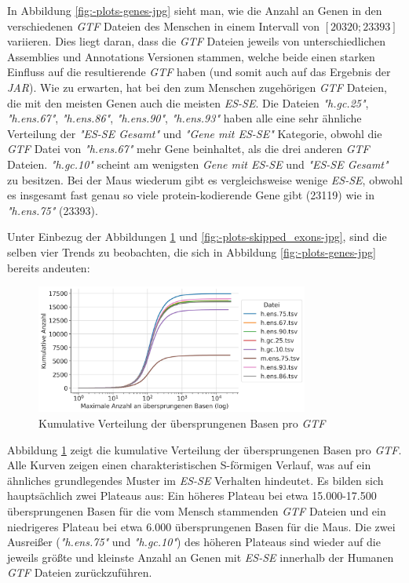 \documentclass[12pt]{article}
\begin{document}
In Abbildung \ref{fig:-plots-genes-jpg} sieht man, wie die Anzahl an Genen in den verschiedenen \textit{GTF} Dateien des
Menschen in einem Intervall von $[20320; 23393]$ variieren. Dies liegt daran, dass die
\textit{GTF} Dateien jeweils von unterschiedlichen Assemblies und Annotations Versionen stammen,
welche beide einen starken Einfluss auf die resultierende \textit{GTF} haben (und somit auch auf das Ergebnis der \textit{JAR}).
Wie zu erwarten, hat bei den zum Menschen zugehörigen \textit{GTF} Dateien, die mit den meisten Genen auch die meisten \textit{ES-SE}.
Die Dateien \textit{"h.gc.25"}, \textit{"h.ens.67"}, \textit{"h.ens.86"}, \textit{"h.ens.90"}, \textit{"h.ens.93"} haben alle eine sehr
ähnliche Verteilung der \textit{"ES-SE Gesamt"} und \textit{"Gene mit ES-SE"} Kategorie, obwohl die \textit{GTF} Datei von
\textit{"h.ens.67"} mehr Gene beinhaltet, als die drei anderen \textit{GTF} Dateien.
\textit{"h.gc.10"} scheint am wenigsten \textit{Gene mit ES-SE} und \textit{"ES-SE Gesamt"} zu besitzen.
Bei der Maus wiederum gibt es vergleichsweise wenige \textit{ES-SE}, obwohl es insgesamt fast genau so viele
protein-kodierende Gene gibt (23119) wie in \textit{"h.ens.75"} (23393).

Unter Einbezug der Abbildungen \ref{fig:-plots-skipped_bases-jpg} und \ref{fig:-plots-skipped_exons-jpg}, sind die
selben vier Trends zu beobachten, die sich in Abbildung \ref{fig:-plots-genes-jpg} bereits andeuten:

\begin{figure}[htpb]
	\centering
	\includegraphics[width=0.8\textwidth]{./plots/skipped_bases.jpg}
	\caption{Kumulative Verteilung der übersprungenen Basen pro \textit{GTF}}
	\label{fig:-plots-skipped_bases-jpg}
\end{figure}


Abbildung \ref{fig:-plots-skipped_bases-jpg} zeigt die kumulative Verteilung der übersprungenen Basen pro \textit{GTF}.
Alle Kurven zeigen einen charakteristischen S-förmigen Verlauf, was auf ein ähnliches grundlegendes Muster im \textit{ES-SE} Verhalten
hindeutet. Es bilden sich hauptsächlich zwei Plateaus aus:
Ein höheres Plateau bei etwa 15.000-17.500 übersprungenen Basen für die vom Mensch stammenden \textit{GTF} Dateien
und ein niedrigeres Plateau bei etwa 6.000 übersprungenen Basen für die Maus.
Die zwei Ausrei\ss er (\textit{"h.ens.75"} und \textit{"h.gc.10"}) des höheren Plateaus sind wieder auf die jeweils
grö\ss te und kleinste Anzahl an Genen mit \textit{ES-SE} innerhalb der Humanen \textit{GTF} Dateien zurückzuführen.
\end{document}
